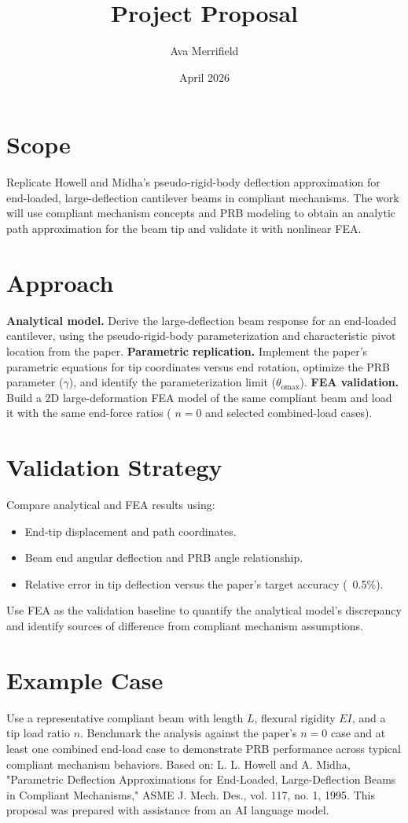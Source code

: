 \documentclass[10pt]{article}
\title{Project Proposal}
\author{Ava Merrifield}
\date{April 2026}
\begin{document}
\maketitle
\section*{Scope}
Replicate Howell and Midha's pseudo-rigid-body deflection approximation for end-loaded, large-deflection cantilever beams in compliant mechanisms. The work will use compliant mechanism concepts and PRB modeling to obtain an analytic path approximation for the beam tip and validate it with nonlinear FEA.
\section*{Approach}
\textbf{Analytical model.} Derive the large-deflection beam response for an end-loaded cantilever, using the pseudo-rigid-body parameterization and characteristic pivot location from the paper.
\textbf{Parametric replication.} Implement the paper's parametric equations for tip coordinates versus end rotation, optimize the PRB parameter ($\gamma$), and identify the parameterization limit ($\theta_{\mathrm{omax}}$).
\textbf{FEA validation.} Build a 2D large-deformation FEA model of the same compliant beam and load it with the same end-force ratios (
$n=0$ and selected combined-load cases).
\section*{Validation Strategy}
Compare analytical and FEA results using:
\begin{itemize}
  \item End-tip displacement and path coordinates.
  \item Beam end angular deflection and PRB angle relationship.
  \item Relative error in tip deflection versus the paper's target accuracy (~0.5\%).
\end{itemize}
Use FEA as the validation baseline to quantify the analytical model's discrepancy and identify sources of difference from compliant mechanism assumptions.
\section*{Example Case}
Use a representative compliant beam with length $L$, flexural rigidity $EI$, and a tip load ratio $n$. Benchmark the analysis against the paper's $n=0$ case and at least one combined end-load case to demonstrate PRB performance across typical compliant mechanism behaviors.
\vfill
{\footnotesize Based on: L. L. Howell and A. Midha, "Parametric Deflection Approximations for End-Loaded, Large-Deflection Beams in Compliant Mechanisms," ASME J. Mech. Des., vol. 117, no. 1, 1995.}
\newline
{\footnotesize This proposal was prepared with assistance from an AI language model.}
\end{document}

